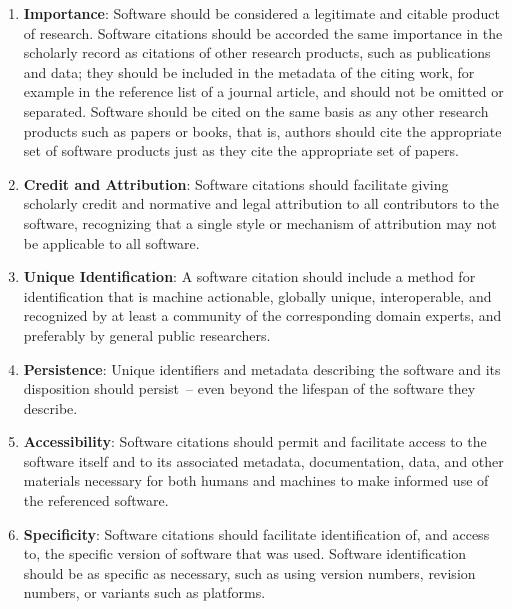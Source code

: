 \documentclass[11pt, oneside]{amsart}
\begin{document}
\begin{enumerate}
\item \textbf{Importance}: \label{principle:importance} Software should be
considered a legitimate and citable product of research. Software citations should
be accorded the same importance in the scholarly record as citations of other
research products, such as publications and data; they should be included in the
metadata of the citing work, for example in the reference list of a journal article,
and should not be omitted or separated.
Software should be cited on the same basis as any other research products such as
papers or books, that is, authors should cite the appropriate set of software
products just as they cite the appropriate set of papers.

\item \textbf{Credit and Attribution}: \label{principle:credit}
Software citations should facilitate giving scholarly credit and normative
and legal attribution to all contributors to the software, recognizing
that a single style or mechanism of attribution may not be applicable to
all software.

\item \textbf{Unique Identification}: \label{principle:uid}
A software citation should include a method for identification that is
machine actionable, globally unique, interoperable, and recognized by
at least a community of the corresponding domain experts, and preferably by
general public researchers.

\item \textbf{Persistence}: \label{principle:persistence}
Unique identifiers and metadata describing the software and its disposition
should persist~-- even beyond the lifespan of the software they describe.

\item \textbf{Accessibility}: \label{principle:accessibility} Software citations
should permit and facilitate access to the software itself and to its
associated metadata, documentation, data, and other materials necessary
for both humans and machines to make informed use of the referenced software.

\item \textbf{Specificity}: Software citations should facilitate identification
of, and access to, the specific version of software that was used. Software
identification should be as specific as necessary, such as using version
numbers, revision numbers, or variants such as platforms.
\end{enumerate}
\end{document}
